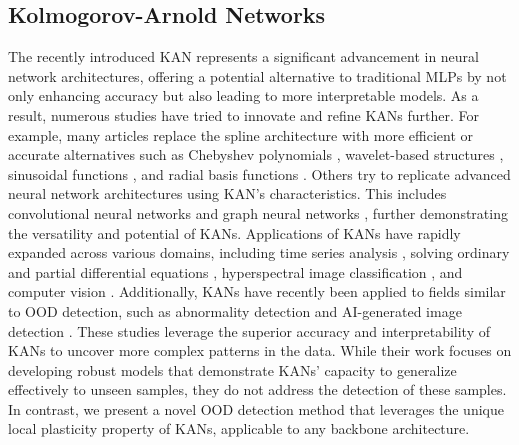 \subsection{Kolmogorov-Arnold Networks}
\label{sec:kan_rel_works}

The recently introduced KAN \citep{hou2024comprehensivesurveykolmogorovarnold} represents a significant advancement in neural network architectures, offering a potential alternative to traditional MLPs by not only enhancing accuracy but also leading to more interpretable models.
As a result, numerous studies have tried to innovate and refine KANs further. 
For example, many articles replace the spline architecture with more efficient or accurate alternatives such as Chebyshev polynomials \citep{ss2024chebyshevpolynomialbasedkolmogorovarnoldnetworks}, wavelet-based structures \citep{bozorgasl2024wavkanwaveletkolmogorovarnoldnetworks}, sinusoidal functions \citep{reinhardt2024sinekankolmogorovarnoldnetworksusing}, and radial basis functions \citep{li2024kolmogorovarnoldnetworksradialbasis}. 
Others try to replicate advanced neural network architectures using KAN's characteristics. 
This includes convolutional neural networks \citep{bodner2024convolutionalkolmogorovarnoldnetworks} and graph neural networks \citep{kiamari2024gkangraphkolmogorovarnoldnetworks, bresson2024kagnnskolmogorovarnoldnetworksmeet, zhang2024graphkanenhancingfeatureextraction}, further demonstrating the versatility and potential of KANs. 
Applications of KANs have rapidly expanded across various domains, including time series analysis \citep{vacarubio2024kolmogorovarnoldnetworkskanstime, xu2024kolmogorovarnoldnetworkstimeseries}, solving ordinary and partial differential equations \citep{koenig2024kanodeskolmogorovarnoldnetworkordinary, wang2024kolmogorovarnoldinformedneural}, hyperspectral image classification \citep{seydi2024unveilingpowerwaveletswaveletbased, jamali2024learnmoreexploringkolmogorovarnold}, and computer vision \citep{azam2024suitabilitykanscomputervision, li2024ukanmakesstrongbackbone, cheon2024kolmogorovarnoldnetworksatelliteimage}. 
Additionally, KANs have recently been applied to fields similar to OOD detection, such as abnormality detection \citep{Huang2024.06.04.24308428} and AI-generated image detection \citep{anon2024detectingundetectablecombiningkolmogorovarnold}. 
These studies leverage the superior accuracy and interpretability of KANs \citep{liu2024kankolmogorovarnoldnetworks} to uncover more complex patterns in the data. 
While their work focuses on developing robust models that demonstrate KANs' capacity to generalize effectively to unseen samples, they do not address the detection of these samples. 
In contrast, we present a novel OOD detection method that leverages the unique local plasticity property of KANs, applicable to any backbone architecture.